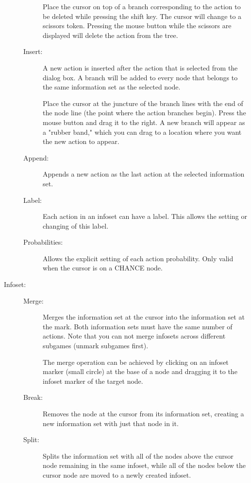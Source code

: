 \documentclass[12pt]{report}
\begin{document}
\begin{description}
\begin{description}
 Place the cursor on top of a
branch corresponding to the action to be deleted while pressing the
shift key.  The cursor will change to a scissors token.  Pressing the
mouse button while the scissors are displayed will delete the action
from the tree.
\item[Insert:] A new action is inserted after the action that is
selected from the dialog box.  A branch will be added to every node
that belongs to the same information set as the selected node.

 Place the cursor at the juncture
of the branch lines with the end of the node line (the point where the
action branches begin).  Press the mouse button and drag it to the
right.  A new branch will appear as a "rubber band," which you can
drag to a location where you want the new action to appear.
\item[Append:] Appends a new action as the last action at the selected
information set.
\item[Label:] Each action in an infoset can have a label.  This allows
the setting or changing of this label.
\item[Probabilities:] Allows the explicit setting of each action
probability.  Only valid when the cursor is on a CHANCE node.
\end{description}

\item[Infoset:]
\begin{description}
\item[Merge:] Merges the information set at the cursor into the
information set at the mark.  Both information sets must have the same
number of actions.  Note that you can not merge infosets across
different subgames (unmark subgames first).

 The merge operation can be
achieved by clicking on an infoset marker (small circle) at the base
of a node and dragging it to the infoset marker of the target node.
\item[Break:] Removes the node at the cursor from its information set,
creating a new information set with just that node in it.
\item[Split:] Splits the information set with all of the nodes above the
cursor node remaining in the same infoset, while all of the nodes
below the cursor node are moved to a newly created infoset.


\end{description}
\end{description}
\end{document}
